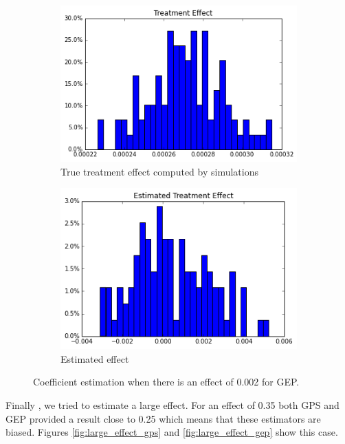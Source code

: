 \documentclass[11pt]{article}
\begin{document}
\begin{figure}[h]
\centering
\begin{subfigure}{.5\textwidth}
  \centering
  \includegraphics[width=.9\linewidth]{treatment_effect_no_influence.png}
  \caption{True treatment effect computed by simulations}
  \label{fig:sub1}
\end{subfigure}%
\begin{subfigure}{.5\textwidth}
  \centering
  \includegraphics[width=.9\linewidth]{estimated_no_influence_gep.png}
  \caption{Estimated effect}
  \label{fig:sub2}
\end{subfigure}
\caption{Coefficient estimation when there is an effect of 0.002 for GEP.}
\label{fig:small_effect_gep}
\end{figure}

Finally , we  tried to estimate a large effect. For an effect of 0.35 both GPS and GEP provided a result close to 0.25 which means that these estimators are biased.   Figures \ref{fig:large_effect_gps} and \ref{fig:large_effect_gep} show this case. 
\end{document}
